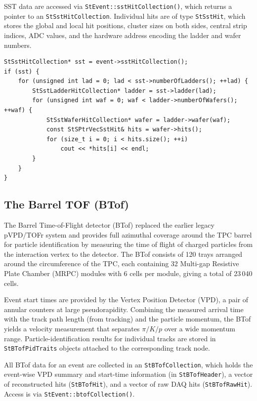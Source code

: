 \documentclass[twoside]{article}
\begin{document}
SST data are accessed via \texttt{StEvent::sstHitCollection()}, which returns
a pointer to an \texttt{StSstHitCollection}.  Individual hits are of type
\texttt{StSstHit}, which stores the global and local hit positions, cluster
sizes on both sides, central strip indices, ADC values, and the hardware address
encoding the ladder and wafer numbers.

\begin{verbatim}
StSstHitCollection* sst = event->sstHitCollection();
if (sst) {
    for (unsigned int lad = 0; lad < sst->numberOfLadders(); ++lad) {
        StSstLadderHitCollection* ladder = sst->ladder(lad);
        for (unsigned int waf = 0; waf < ladder->numberOfWafers(); ++waf) {
            StSstWaferHitCollection* wafer = ladder->wafer(waf);
            const StSPtrVecSstHit& hits = wafer->hits();
            for (size_t i = 0; i < hits.size(); ++i)
                cout << *hits[i] << endl;
        }
    }
}
\end{verbatim}


\subsection{The Barrel TOF (BTof)}
The Barrel Time-of-Flight detector (BTof) replaced the earlier legacy
pVPD/TOFr system and provides full azimuthal coverage around the TPC barrel for
particle identification by measuring the time of flight of charged particles from
the interaction vertex to the detector.  The BTof consists of 120 trays arranged
around the circumference of the TPC, each containing 32 Multi-gap Resistive Plate
Chamber (MRPC) modules with 6 cells per module, giving a total of 23\,040 cells.

Event start times are provided by the Vertex Position Detector (VPD), a pair of
annular counters at large pseudorapidity.  Combining the measured arrival time
with the track path length (from tracking) and the particle momentum, the BTof
yields a velocity measurement that separates $\pi/K/p$ over a wide momentum range.
Particle-identification results for individual tracks are stored in
\texttt{StBTofPidTraits} objects attached to the corresponding track node.

All BTof data for an event are collected in an \texttt{StBTofCollection}, which
holds the event-wise VPD summary and start-time information (in
\texttt{StBTofHeader}), a vector of reconstructed hits (\texttt{StBTofHit}), and
a vector of raw DAQ hits (\texttt{StBTofRawHit}).  Access is via
\texttt{StEvent::btofCollection()}.
\end{document}
